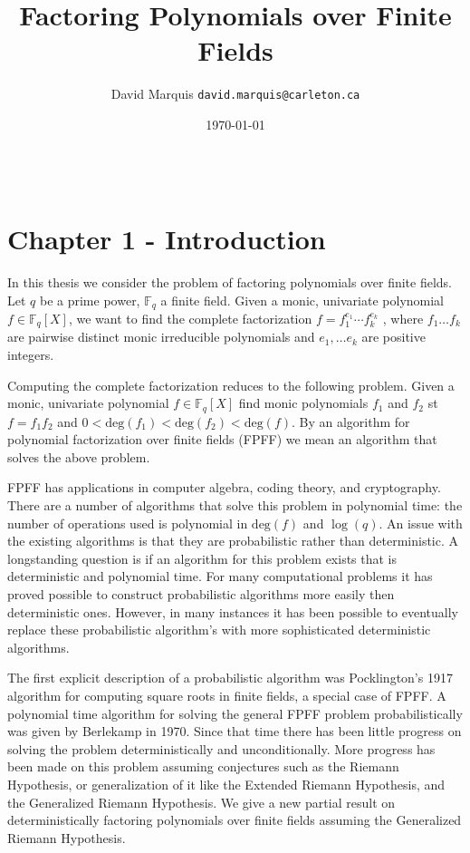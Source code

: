 \documentclass[a4paper]{article}
\def\Fq {{ \mathbb{F} _ {q} }}
\def\deg {{ \mathrm{deg}}}
\begin{document}
\title{Factoring Polynomials over Finite Fields}
\author{David Marquis
    \texttt{david.marquis@carleton.ca}}
\date{\today}
\maketitle

%
\begin{abstract} \
%

\end{abstract}

%
\section*{Chapter 1 - Introduction} 

In this thesis we consider the problem of factoring polynomials over finite fields. Let $q$ be a prime power, $\Fq$ a finite field. Given a monic, univariate polynomial $f \in \Fq[X]$, we want to find the complete factorization $f = f_1^{e_1} \cdots f_k^{e_k}$ , where $f_1 \dots f_k$ are pairwise distinct monic irreducible polynomials and $e_1, \dots e_k$ are positive integers. 

Computing the complete factorization reduces to the following problem. Given a monic, univariate polynomial $f \in \Fq[X]$ find monic polynomials $f_1$ and $f_2$ st $f = f_1f_2$ and $0 < \deg(f_1) < \deg(f_2) < \deg(f)$. By an algorithm for polynomial factorization over finite fields (FPFF) we mean an algorithm that solves the above problem. 

FPFF has applications in computer algebra, coding theory, and cryptography. There are a number of algorithms that solve this problem in polynomial time: the number of operations used is polynomial in $\deg(f)$ and $\log(q)$. An issue with the existing algorithms is that they are probabilistic rather than deterministic. A longstanding question is if an algorithm for this problem exists that is deterministic and polynomial time. For many computational problems it has proved possible to construct probabilistic algorithms more easily then deterministic ones. However, in many instances it has been possible to eventually replace these probabilistic algorithm's with more sophisticated deterministic algorithms. 

The first explicit description of a probabilistic algorithm was Pocklington's 1917 algorithm for computing square roots in finite fields, a special case of FPFF. A polynomial time algorithm for solving the general FPFF problem probabilistically was given by Berlekamp in 1970. Since that time there has been little progress on solving the problem deterministically and unconditionally. More progress has been made on this problem assuming conjectures such as the Riemann Hypothesis, or generalization of it like the Extended Riemann Hypothesis, and the Generalized Riemann Hypothesis. We give a new partial result on deterministically factoring polynomials over finite fields assuming the Generalized Riemann Hypothesis. 
\end{document}
